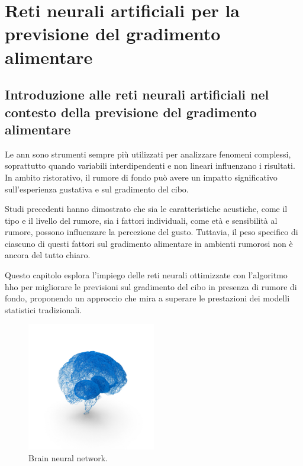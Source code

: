 
%

\chapter{Reti neurali artificiali per la previsione del gradimento alimentare}
\label{cha:chapter4}

\section{Introduzione alle reti neurali artificiali nel contesto della previsione del gradimento alimentare}

Le \gls{ann} sono strumenti sempre più utilizzati per analizzare fenomeni complessi, soprattutto quando variabili interdipendenti e non lineari influenzano i risultati. In ambito ristorativo, il rumore di fondo può avere un impatto significativo sull'esperienza gustativa e sul gradimento del cibo.

Studi precedenti hanno dimostrato che sia le caratteristiche acustiche, come il tipo e il livello del rumore, sia i fattori individuali, come età e sensibilità al rumore, possono influenzare la percezione del gusto. Tuttavia, il peso specifico di ciascuno di questi fattori sul gradimento alimentare in ambienti rumorosi non è ancora del tutto chiaro.

Questo capitolo esplora l'impiego delle reti neurali ottimizzate con l'algoritmo \gls{hho} per migliorare le previsioni sul gradimento del cibo in presenza di rumore di fondo, proponendo un approccio che mira a superare le prestazioni dei modelli statistici tradizionali.

\begin{figure}[H]
    \centering
    \includegraphics[width=0.5\textwidth]{Chapters/Figures/brain.png}
    \caption{\small Brain neural network. \cite{neural2024}}
    \label{fig:brain}
\end{figure}

